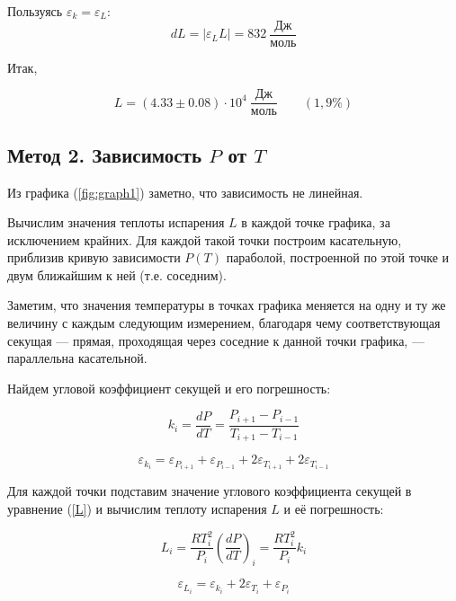 \documentclass[a4paper,12pt]{article} %
\begin{document}
Пользуясь $\varepsilon_k =  \varepsilon_L$:
\begin{equation}
  dL =  |\varepsilon_L L| = 832\ \frac{\mbox{Дж}}{\mbox{моль}}
\end{equation} 

Итак,

\begin{equation}
  L = (4.33 \pm 0.08) \cdot 10^{4}\ \frac{\mbox{Дж}}{\mbox{моль}} \qquad (1,9\%) 
\end{equation}


\subsection*{Метод 2. Зависимость $P$ от $T$}

Из графика (\ref{fig:graph1}) заметно, что зависимость не линейная. 

Вычислим значения теплоты испарения $L$ в каждой точке графика, за исключением крайних. 
Для каждой такой точки построим касательную, приблизив кривую зависимости $P(T)$ параболой, 
построенной по этой точке и двум ближайшим к ней (т.е. соседним). 

Заметим, что значения температуры в точках графика меняется на одну и ту же величину 
с каждым следующим измерением, благодаря чему соответствующая секущая — прямая, проходящая через соседние к данной точки 
графика, — параллельна касательной. 

Найдем угловой коэффициент секущей и его погрешность:

\begin{equation}
  \label{sec}
  k_i = \frac{dP}{dT} = \frac{P_{i + 1} - P_{i - 1}}{T_{i + 1} - T_{i - 1}}
\end{equation}

\begin{equation}
  \label{eps_k_i}
  \varepsilon_{k_i} = \varepsilon_{P_{i + 1}} + \varepsilon_{P_{i - 1}} + 2\varepsilon_{T_{i + 1}} + 2\varepsilon_{T_{i - 1}}
\end{equation}

Для каждой точки подставим значение углового коэффициента секущей в уравнение (\ref{L}) и вычислим теплоту испарения $L$ и её погрешность:

\begin{equation}
  L_i = \frac{RT_i^2}{P_i}\left(\frac{dP}{dT}\right)_i = \frac{RT_i^2}{P_i}k_i
\end{equation}

\begin{equation}
  \label{eps_L_i}
  \varepsilon_{L_i} = \varepsilon_{k_i} + 2\varepsilon_{T_i} + \varepsilon_{P_i} 
\end{equation}
\end{document}
